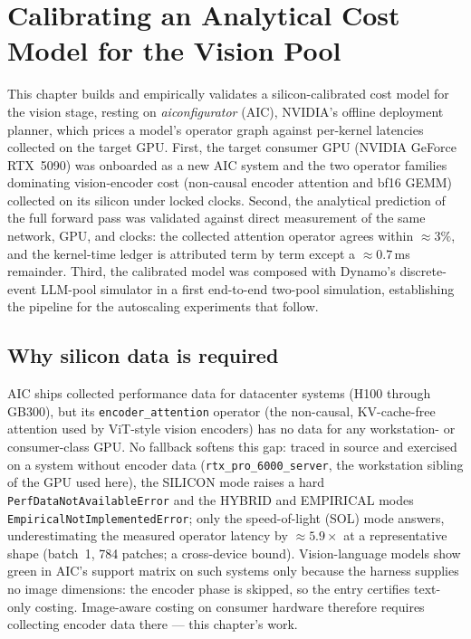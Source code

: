 \chapter{Calibrating an Analytical Cost Model for the Vision Pool}
\label{cap:aiconfigurator}

This chapter builds and empirically validates a silicon-calibrated cost
model for the vision stage, resting on \textit{aiconfigurator} (AIC),
NVIDIA's offline deployment planner, which prices a model's operator graph
against per-kernel latencies collected on the target GPU. First, the target
consumer GPU (NVIDIA GeForce RTX~5090) was onboarded as a new AIC system and
the two operator families dominating vision-encoder cost (non-causal encoder
attention and bf16 GEMM) collected on its silicon under locked clocks.
Second, the analytical prediction of the full forward pass was validated
against direct measurement of the same network, GPU, and clocks: the
collected attention operator agrees within ${\approx}3\%$, and the kernel-time
ledger is attributed term by term except a ${\approx}0.7$\,ms remainder. Third,
the calibrated model was composed with Dynamo's discrete-event LLM-pool
simulator in a first end-to-end two-pool simulation, establishing the
pipeline for the autoscaling experiments that follow.

\section{Why silicon data is required}
\label{sec:aic-motivation}

AIC ships collected performance data for datacenter systems (H100 through
GB300), but its \texttt{encoder\_attention} operator (the non-causal,
KV-cache-free attention used by ViT-style vision encoders) has no data for
any workstation- or consumer-class GPU. No fallback softens this gap: traced
in source and exercised on a system without encoder data
(\texttt{rtx\_pro\_6000\_server}, the workstation sibling of the GPU used
here), the SILICON mode raises a hard \texttt{PerfDataNotAvailableError} and
the HYBRID and EMPIRICAL modes \texttt{EmpiricalNotImplementedError}; only
the speed-of-light (SOL) mode answers, underestimating the measured operator
latency by ${\approx}5.9\times$ at a representative shape (batch~1, 784
patches; a cross-device bound). Vision-language models show green in AIC's
support matrix on such systems only because the harness supplies no image
dimensions: the encoder phase is skipped, so the entry certifies text-only
costing. Image-aware costing on consumer hardware therefore requires
collecting encoder data there --- this chapter's work.

